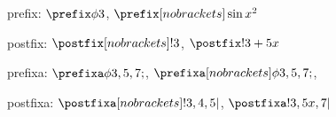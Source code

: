 \documentclass[minimal]{omdoc}
\begin{document}
prefix: $\prefix\phi{3}$, $\prefix[nobrackets]\sin{x^2}$

postfix: $\postfix[nobrackets]!3$, $\postfix!{3+5x}$

prefixa: $\prefixa\phi{3,5,7};$, $\prefixa[nobrackets]\phi{3,5,7};$,

postfixa: $\postfixa[nobrackets]!{3,4,5}|$, $\postfixa!{3,5x,7}|$
\end{document}
